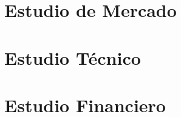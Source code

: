 \documentclass[sn-mathphys]{svmono}
\begin{document}
\chapter{Estudio de Mercado}%
\label{cha:Estudio de Mercado}













\chapter{Estudio Técnico}







\chapter{Estudio Financiero}







\printbibliography
\end{document}

